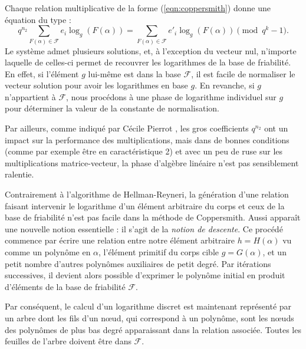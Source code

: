 \documentclass[a4paper, titlepage, 11pt]{article}
\theoremstyle{definition}
\theoremstyle{remark}
\begin{document}
Chaque relation multiplicative de la forme (\ref{eqn:coppersmith}) donne une équation du type :
$$q^{n_2} \sum_{F(\alpha) \in \mathcal{F}} e_i \log_g(F(\alpha)) = \sum_{F(\alpha) \in \mathcal{F}} e'_i \log_g(F(\alpha)) \pmod{q^k-1}.$$
Le système admet plusieurs solutions, et, à l'exception du vecteur nul, n'importe laquelle de celles-ci permet de recouvrer les logarithmes de la base de friabilité. En effet, si l'élément $g$ lui-même est dans la base $\mathcal{F}$, il est facile de normaliser le vecteur solution pour avoir les logarithmes en base $g$. En revanche, si $g$ n'appartient à $\mathcal{F}$, nous procédons à une phase de logarithme individuel sur $g$ pour déterminer la valeur de la constante de normalisation.

Par ailleurs, comme indiqué par Cécile Pierrot \cite{pierrot2016}, les gros coefficients $q^{n_2}$ ont un impact sur la performance des multiplications, mais dans de bonnes conditions (comme par exemple être en caractéristique 2) et avec un peu de ruse sur les multiplications matrice-vecteur, la phase d'algèbre linéaire n'est pas sensiblement ralentie.

Contrairement à l'algorithme de Hellman-Reyneri, la génération d'une relation faisant intervenir le logarithme d'un élément arbitraire du corps et ceux de la base de friabilité n'est pas facile dans la méthode de Coppersmith. Aussi apparaît une nouvelle notion essentielle : il s'agit de la \textit{notion de descente}. Ce procédé commence par écrire une relation entre notre élément arbitraire $h = H(\alpha)$ vu comme un polynôme en $\alpha$, l'élément primitif du corps cible $g = G(\alpha)$, et un petit nombre d'autres polynômes auxiliaires de petit degré. Par itérations successives, il devient alors possible d'exprimer le polynôme initial en produit d'éléments de la base de friabilité $\mathcal{F}$.

Par conséquent, le calcul d'un logarithme discret est maintenant représenté par un arbre dont les fils d'un n\oe ud, qui correspond à un polynôme, sont les n\oe uds des polynômes de plus bas degré apparaissant dans la relation associée. Toutes les feuilles de l'arbre doivent être dans $\mathcal{F}$.
\end{document}
